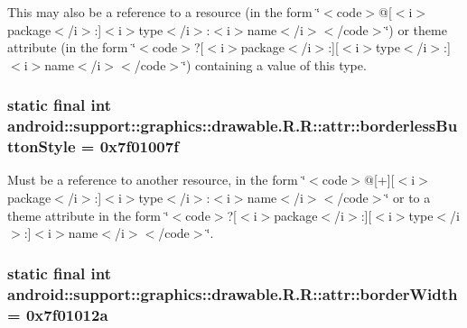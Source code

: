 This may also be a reference to a resource (in the form \char`\"{}$<$code$>$@\mbox{[}$<$i$>$package$<$/i$>$:\mbox{]}$<$i$>$type$<$/i$>$:$<$i$>$name$<$/i$>$$<$/code$>$\char`\"{}) or theme attribute (in the form \char`\"{}$<$code$>$?\mbox{[}$<$i$>$package$<$/i$>$:\mbox{]}\mbox{[}$<$i$>$type$<$/i$>$:\mbox{]}$<$i$>$name$<$/i$>$$<$/code$>$\char`\"{}) containing a value of this type. \hypertarget{classandroid_1_1support_1_1graphics_1_1drawable_1_1_r_1_1attr_2fea1c18ee2eb3df4572741f14c11b82}{
\subsubsection[{borderlessButtonStyle}]{\setlength{\rightskip}{0pt plus 5cm}static final int android::support::graphics::drawable.R.R::attr::borderlessButtonStyle = 0x7f01007f}}
\label{classandroid_1_1support_1_1graphics_1_1drawable_1_1_r_1_1attr_2fea1c18ee2eb3df4572741f14c11b82}


Must be a reference to another resource, in the form \char`\"{}$<$code$>$@\mbox{[}+\mbox{]}\mbox{[}$<$i$>$package$<$/i$>$:\mbox{]}$<$i$>$type$<$/i$>$:$<$i$>$name$<$/i$>$$<$/code$>$\char`\"{} or to a theme attribute in the form \char`\"{}$<$code$>$?\mbox{[}$<$i$>$package$<$/i$>$:\mbox{]}\mbox{[}$<$i$>$type$<$/i$>$:\mbox{]}$<$i$>$name$<$/i$>$$<$/code$>$\char`\"{}. \hypertarget{classandroid_1_1support_1_1graphics_1_1drawable_1_1_r_1_1attr_40801de38e6454d51fb3d4ba534c8d9e}{
\subsubsection[{borderWidth}]{\setlength{\rightskip}{0pt plus 5cm}static final int android::support::graphics::drawable.R.R::attr::borderWidth = 0x7f01012a}}
\label{classandroid_1_1support_1_1graphics_1_1drawable_1_1_r_1_1attr_40801de38e6454d51fb3d4ba534c8d9e}


